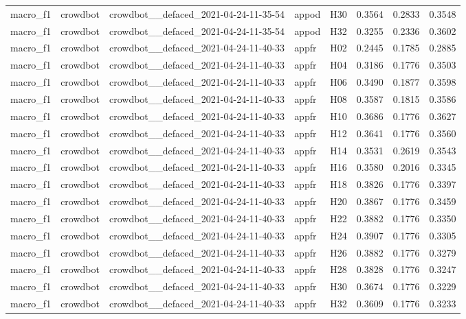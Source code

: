 \begin{table}[tbp]
\begin{tabular}{lllllrrr}
macro\_f1 & crowdbot & crowdbot\_\_defaced\_2021-04-24-11-35-54 & appod & H30 & 0.3564 & 0.2833 & 0.3548 \\
macro\_f1 & crowdbot & crowdbot\_\_defaced\_2021-04-24-11-35-54 & appod & H32 & 0.3255 & 0.2336 & 0.3602 \\
macro\_f1 & crowdbot & crowdbot\_\_defaced\_2021-04-24-11-40-33 & appfr & H02 & 0.2445 & 0.1785 & 0.2885 \\
macro\_f1 & crowdbot & crowdbot\_\_defaced\_2021-04-24-11-40-33 & appfr & H04 & 0.3186 & 0.1776 & 0.3503 \\
macro\_f1 & crowdbot & crowdbot\_\_defaced\_2021-04-24-11-40-33 & appfr & H06 & 0.3490 & 0.1877 & 0.3598 \\
macro\_f1 & crowdbot & crowdbot\_\_defaced\_2021-04-24-11-40-33 & appfr & H08 & 0.3587 & 0.1815 & 0.3586 \\
macro\_f1 & crowdbot & crowdbot\_\_defaced\_2021-04-24-11-40-33 & appfr & H10 & 0.3686 & 0.1776 & 0.3627 \\
macro\_f1 & crowdbot & crowdbot\_\_defaced\_2021-04-24-11-40-33 & appfr & H12 & 0.3641 & 0.1776 & 0.3560 \\
macro\_f1 & crowdbot & crowdbot\_\_defaced\_2021-04-24-11-40-33 & appfr & H14 & 0.3531 & 0.2619 & 0.3543 \\
macro\_f1 & crowdbot & crowdbot\_\_defaced\_2021-04-24-11-40-33 & appfr & H16 & 0.3580 & 0.2016 & 0.3345 \\
macro\_f1 & crowdbot & crowdbot\_\_defaced\_2021-04-24-11-40-33 & appfr & H18 & 0.3826 & 0.1776 & 0.3397 \\
macro\_f1 & crowdbot & crowdbot\_\_defaced\_2021-04-24-11-40-33 & appfr & H20 & 0.3867 & 0.1776 & 0.3459 \\
macro\_f1 & crowdbot & crowdbot\_\_defaced\_2021-04-24-11-40-33 & appfr & H22 & 0.3882 & 0.1776 & 0.3350 \\
macro\_f1 & crowdbot & crowdbot\_\_defaced\_2021-04-24-11-40-33 & appfr & H24 & 0.3907 & 0.1776 & 0.3305 \\
macro\_f1 & crowdbot & crowdbot\_\_defaced\_2021-04-24-11-40-33 & appfr & H26 & 0.3882 & 0.1776 & 0.3279 \\
macro\_f1 & crowdbot & crowdbot\_\_defaced\_2021-04-24-11-40-33 & appfr & H28 & 0.3828 & 0.1776 & 0.3247 \\
macro\_f1 & crowdbot & crowdbot\_\_defaced\_2021-04-24-11-40-33 & appfr & H30 & 0.3674 & 0.1776 & 0.3229 \\
macro\_f1 & crowdbot & crowdbot\_\_defaced\_2021-04-24-11-40-33 & appfr & H32 & 0.3609 & 0.1776 & 0.3233 \\

\end{tabular}
\end{table}
